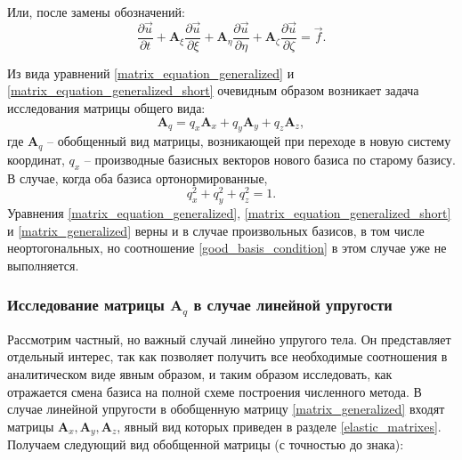 Или, после замены обозначений:
\begin{equation}
\label{matrix_equation_generalized_short}
\frac{\partial\vec{u}}{\partial{t}} + \mathbf{A}_\xi \frac{\partial\vec{u}}{\partial{\xi}} + 
\mathbf{A}_\eta \frac{\partial\vec{u}}{\partial{\eta}} + \mathbf{A}_\zeta \frac{\partial\vec{u}}{\partial{\zeta}} = \vec f.
\end{equation}

Из вида уравнений \ref{matrix_equation_generalized} и \ref{matrix_equation_generalized_short} очевидным образом возникает задача исследования матрицы общего вида:
\begin{equation}
\label{matrix_generalized}
\mathbf{A}_q = q_x \mathbf{A}_x  + q_y \mathbf{A}_y + q_z \mathbf{A}_z,
\end{equation}
где $\mathbf{A}_q$ -- обобщенный вид матрицы, возникающей при переходе в новую систему координат, $q_x$ -- производные базисных векторов нового базиса по старому базису. В случае, когда оба базиса ортонормированные,
\begin{equation}
\label{good_basis_condition}
q_x^2 + q_y^2 + q_z^2 = 1.
\end{equation}
Уравнения \ref{matrix_equation_generalized}, \ref{matrix_equation_generalized_short} и \ref{matrix_generalized} верны и в случае произвольных базисов, в том числе неортогональных, но соотношение \ref{good_basis_condition} в этом случае уже не выполняется.

\subsubsection{Исследование матрицы $\mathbf{A}_q$ в случае линейной упругости}

Рассмотрим частный, но важный случай линейно упругого тела. Он представляет отдельный интерес, так как позволяет получить все необходимые соотношения в аналитическом виде явным образом, и таким образом исследовать, как отражается смена базиса на полной схеме построения численного метода. В случае линейной упругости в обобщенную матрицу \ref{matrix_generalized} входят матрицы $\mathbf{A}_x, \mathbf{A}_y, \mathbf{A}_z$, явный вид которых приведен в разделе \ref{elastic_matrixes}. Получаем следующий вид обобщенной матрицы (с точностью до знака):

